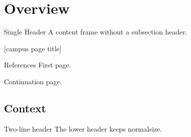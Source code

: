 \documentclass{beamer}
\begin{document}
\section{Overview}
\sectiontocpage
\begin{frame}{Single Header}
A content frame without a subsection header.
\end{frame}
\begingroup
{}[campus page title]
\begin{frame}[allowframebreaks]{References}
First page.\par
\framebreak
\par Continuation page.
\end{frame}
\endgroup
\subsection{Context}
\begin{frame}{Two-line header}
The lower header keeps normalsize.
\end{frame}
\end{document}
